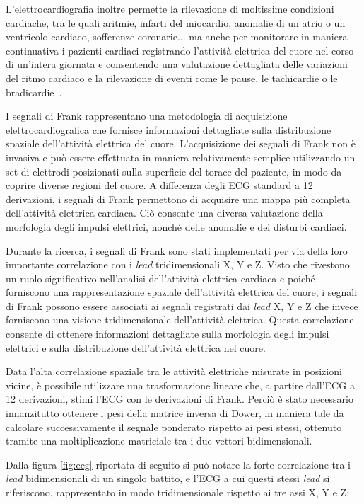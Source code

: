 \documentclass[12pt,italian]{report}
\begin{document}
L'elettrocardiografia inoltre permette la rilevazione di moltissime condizioni cardiache, tra le quali aritmie, infarti del miocardio, anomalie di un atrio o un ventricolo cardiaco, sofferenze coronarie... ma anche per monitorare in maniera continuativa i pazienti cardiaci registrando l'attività elettrica del cuore nel corso di un'intera giornata e consentendo una valutazione dettagliata delle variazioni del ritmo cardiaco e la rilevazione di eventi come le pause, le tachicardie o le bradicardie~\cite{classification}.

I segnali di Frank rappresentano una metodologia di acquisizione elettrocardiografica che fornisce informazioni dettagliate sulla distribuzione spaziale dell'attività elettrica del cuore. L'acquisizione dei segnali di Frank non è invasiva e può essere effettuata in maniera relativamente semplice utilizzando un set di elettrodi posizionati sulla superficie del torace del paziente, in modo da coprire diverse regioni del cuore. A differenza degli ECG standard a 12 derivazioni, i segnali di Frank permettono di acquisire una mappa più completa dell'attività elettrica cardiaca. Ciò consente una diversa valutazione della morfologia degli impulsi elettrici, nonché delle anomalie e dei disturbi cardiaci.

Durante la ricerca, i segnali di Frank sono stati implementati per via della loro importante correlazione con i \textit{lead} tridimensionali X, Y e Z. Visto che rivestono un ruolo significativo nell'analisi dell'attività elettrica cardiaca e poiché forniscono una rappresentazione spaziale dell'attività elettrica del cuore, i segnali di Frank possono essere associati ai segnali registrati dai \textit{lead} X, Y e Z che invece forniscono una visione tridimensionale dell'attività elettrica. Questa correlazione consente di ottenere informazioni dettagliate sulla morfologia degli impulsi elettrici e sulla distribuzione dell'attività elettrica nel cuore.

Data l'alta correlazione spaziale tra le attività elettriche misurate in posizioni vicine, è possibile utilizzare una trasformazione lineare che, a partire dall'ECG a 12 derivazioni, stimi l'ECG con le derivazioni di Frank. Perciò è stato necessario innanzitutto ottenere i pesi della matrice inversa di Dower, in maniera tale da calcolare successivamente il segnale ponderato rispetto ai pesi stessi, ottenuto tramite una moltiplicazione matriciale tra i due vettori bidimensionali.

Dalla figura \ref{fig:ecg} riportata di seguito si può notare la forte correlazione tra i \textit{lead} bidimensionali di un singolo battito, e l'ECG a cui questi stessi \textit{lead} si riferiscono, rappresentato in modo tridimensionale rispetto ai tre assi X, Y e Z:
\end{document}
